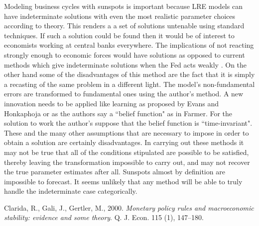 \documentclass[]{article}
\begin{document}
Modeling business cycles with sunspots is important because LRE models can have indeterminate solutions with even the most realistic parameter choices according to theory. This renders a a set of solutions untenable using standard techniques. If such a solution could be found then it would be of interest to economists working at central banks everywhere. The implications of not reacting strongly enough to economic forces would have solutions as opposed to current methods which give indeterminate solutions when the Fed acts weakly \cite{clarida}. On the other hand some of the disadvantages of this method are the fact that it is simply a recasting of the same problem in a different light. The model's non-fundamental errors are transformed to fundamental ones using the author's method. A new innovation needs to be applied like learning as proposed by Evans and Honkaphoja or as the authors say a ``belief function" as in Farmer. For the solution to work the author's suppose that the belief function is ``time-invariant". These and the many other assumptions that are necessary to impose in order to obtain a solution are certainly disadvantages. In carrying out these methods it may not be true that all of the conditions stipulated are possible to be satisfied, thereby leaving the transformation impossible to carry out, and may not recover the true parameter estimates after all. Sunspots almost by definition are impossible to forecast. It seems unlikely that any method will be able to truly handle the indeterminate case categorically.  


\begin{thebibliography}{9}
Clarida, R., Gali, J., Gertler, M., 2000. \textit{Monetary policy rules and macroeconomic stability: evidence and some theory}. Q. J. Econ. 115 (1), 147–180.

	
\end{thebibliography} 
\end{document}
